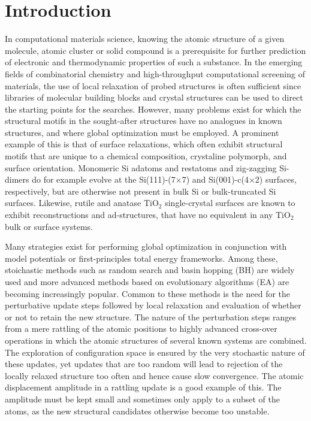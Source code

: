 \documentclass[aip,amsmath,amssymb,reprint]{revtex4-1}
\begin{document}
\section{\label{sec:introduction}Introduction}
In computational materials science, knowing the atomic structure of a
given molecule, atomic cluster or solid compound is a prerequisite for
further prediction of electronic and thermodynamic properties of such
a substance. In the emerging fields of combinatorial chemistry and
high-throughput computational screening of materials,\cite{curtarolo2013} the use of local
relaxation of probed structures is often sufficient since libraries of
molecular building blocks and crystal structures can be used to direct
the starting points for the searches.\cite{hafner2006} However, many problems exist for
which the structural motifs in the sought-after structures have no
analogues in known structures, and where global optimization must be
employed. A prominent example of this is that of surface relaxations,
which often exhibit structural motifs that are unique to a chemical
composition, crystaline polymorph, and surface orientation. Monomeric
Si adatoms and restatoms and zig-zagging Si-dimers do for example evolve at the
Si(111)-(7$\times$7) and Si(001)-c(4$\times$2) surfaces,\cite{si7x7,si4x2} respectively, but
are otherwise not present in bulk Si or bulk-truncated Si surfaces. Likewise,
rutile and anatase TiO$_2$ single-crystal surfaces are known to exhibit
reconstructions and ad-structures,\cite{anatase1,anatase2,rutile1,rutile2} that have no equivalent in any TiO$_2$ bulk or surface systems.

Many strategies exist for performing global optimization in
conjunction with model potentials or first-principles total energy
frameworks. Among these, stoichastic methods such as random search\cite{pickard2011} and
basin hopping (BH)\cite{wales1997} are widely used and more advanced methods based on
evolutionary algorithms (EA) are becoming increasingly popular.\cite{johnston2003,Oganov2006,Bhattacharya2013} Common
to these methods is the need for the perturbative update steps
followed by local relaxation and evaluation of whether or not to
retain the new structure. The nature of the perturbation steps ranges
from a mere rattling of the atomic positions to highly advanced
cross-over operations in which the atomic structures of several known
systems are combined.\cite{ho1995} The exploration of configuration space is
ensured by the very stochastic nature of these updates,\cite{mathias2018} yet updates
that are too random will lead to rejection of the locally
relaxed structure too often and hence cause slow convergence. The atomic
displacement amplitude in a rattling update is a good example of
this. The amplitude must be kept small and sometimes only apply to a
subset of the atoms, as the new structural candidates otherwise become
too unstable.
\end{document}
